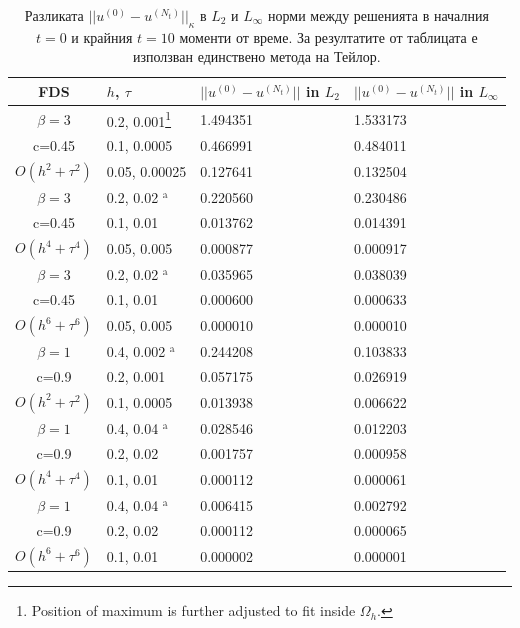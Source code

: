 \documentclass{article}
\begin{document}
\begin{table}[ht]
\centering
\small
		\begin{tabular}{||c|l|l|l||}
			\hline
			\hline
      FDS        & $h$, $\tau$  & $||u^{(0)} - u^{(N_t)}||$ in $L_2$  & $||u^{(0)} - u^{(N_t)}||$ in $L_\infty$   \\
   		\hline 
			\hline
  $\beta=3$                &0.2, 0.001\footnote{Position of maximum is further adjusted to fit inside $\Omega_h$.}            & 1.494351 & 1.533173    \\
   c=0.45                     &0.1, 0.0005          & 0.466991 & 0.484011       \\
     $O(h^2 + \tau^ 2)$ &0.05, 0.00025   & 0.127641 & 0.132504      \\
			\hline 
  $\beta=3$               &0.2, 0.02 $^{\text{a}}$      &0.220560 & 0.230486       \\
   c=0.45                    &0.1, 0.01      &0.013762 & 0.014391        \\
     $O(h^4+ \tau^4)$ &0.05, 0.005&0.000877 & 0.000917         \\
			\hline 
  $\beta=3$               &0.2, 0.02 $^{\text{a}}$       &  0.035965 & 0.038039        \\
     c=0.45                 &0.1, 0.01        &0.000600 & 0.000633       \\
     $O(h^6+ \tau^6)$ &0.05, 0.005 &0.000010 & 0.000010          \\
	   \hline
			\hline 
       $\beta=1$       &0.4, 0.002 $^{\text{a}}$       & 0.244208 & 0.103833 \\
                  c=0.9    &0.2, 0.001       &  0.057175 & 0.026919  \\
  $O(h^2+ \tau^2)$ &0.1, 0.0005   & 0.013938 & 0.006622  \\
			\hline
      $\beta=1$               &0.4, 0.04 $^{\text{a}}$    &0.028546 & 0.012203 \\
       c=0.9                     &0.2, 0.02     & 0.001757 & 0.000958     \\
       $O(h^4+ \tau^4)$ &0.1, 0.01   & 0.000112 & 0.000061   \\
    \hline
  $\beta=1$                  &0.4, 0.04 $^{\text{a}}$   &0.006415 & 0.002792  \\
      c=0.9                    &0.2, 0.02   &0.000112 & 0.000065     \\
     $O(h^6+ \tau^6)$ &0.1, 0.01 & 0.000002 & 0.000001         \\
	   \hline
			\hline 
		\end{tabular}
		\caption{Разликата $||u^{(0)} - u^{(N_t)}||_\kappa$ в $L_2$ и $L_\infty$ норми между решенията в началния $t=0$ и крайния $t=10$ моменти от време. За резултатите от таблицата е използван единствено метода на Тейлор.}
\label{tableG}
\end{table}
\end{document}
